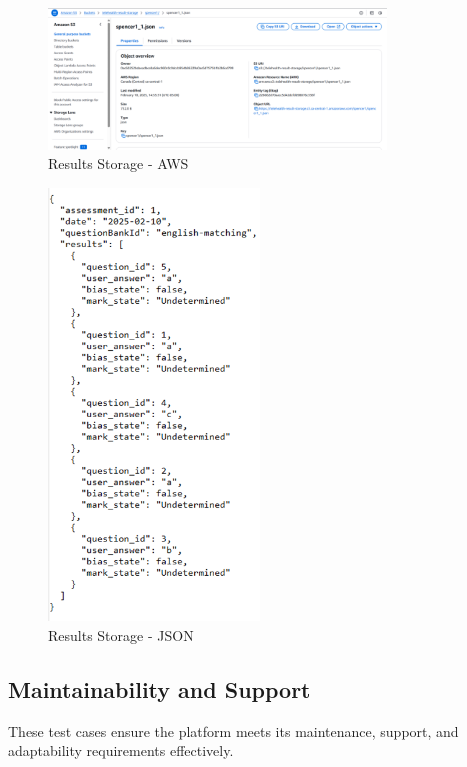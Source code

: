 \documentclass[12pt, titlepage]{article}
\begin{document}
\begin{figure}[h]
  \centering
  \includegraphics[width=0.8\textwidth]{images/ResultsStorage.png}
  \caption{Results Storage - AWS \cite{telehealthStorage}}
\end{figure}

\begin{figure}[h]
  \centering
  \includegraphics[width=0.5\textwidth]{images/ResultsStorage2.png}
  \caption{Results Storage - JSON}
\end{figure}

\clearpage

\subsection{Maintainability and Support}
\hspace{2em}These test cases ensure the platform meets its maintenance, support, and adaptability requirements effectively.
\end{document}

